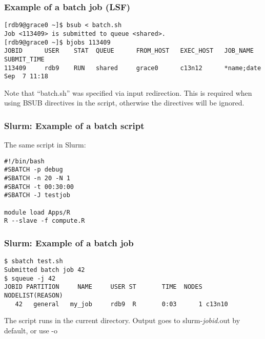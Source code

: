 \documentclass[10pt]{beamer}
\newcommand\smallfont{\fontsize{8pt}{7.2}\selectfont}
\newcommand\regfont{\fontsize{10pt}{7.2}\selectfont}
\begin{document}
\begin{frame}[fragile]
\frametitle{Example of a batch job (LSF)}
\smallfont
\begin{verbatim}
[rdb9@grace0 ~]$ bsub < batch.sh
Job <113409> is submitted to queue <shared>.
[rdb9@grace0 ~]$ bjobs 113409
JOBID      USER    STAT  QUEUE      FROM_HOST   EXEC_HOST   JOB_NAME   SUBMIT_TIME
113409     rdb9    RUN   shared     grace0      c13n12      *name;date Sep  7 11:18
\end{verbatim}

\regfont
\vskip14pt
Note that ``batch.sh'' was specified via input redirection.
This is required when using BSUB directives in the script,
otherwise the directives will be ignored.
\end{frame}

\begin{frame}[fragile]
\frametitle{Slurm: Example of a batch script}
The same script in Slurm:

\begin{block}{}
\begin{verbatim}
#!/bin/bash
#SBATCH -p debug 
#SBATCH -n 20 -N 1
#SBATCH -t 00:30:00  
#SBATCH -J testjob

module load Apps/R
R --slave -f compute.R
\end{verbatim}
\end{block}{}
\end{frame}

\begin{frame}[fragile]
\frametitle{Slurm: Example of a batch job}
\smallfont
\begin{verbatim}
$ sbatch test.sh
Submitted batch job 42
$ squeue -j 42
JOBID PARTITION     NAME     USER ST       TIME  NODES NODELIST(REASON)
   42   general   my_job     rdb9  R       0:03      1 c13n10
\end{verbatim}
\vskip14pt
\regfont
The script runs in the current directory.  
Output goes to slurm-\textit{jobid}.out by default, or use -o
\end{frame}


\end{document}

